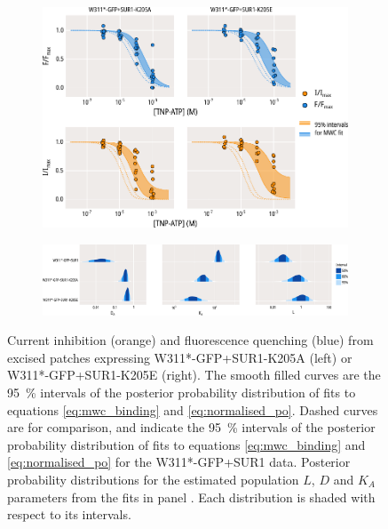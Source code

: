 \begin{figure}[h]
	\centering
	\begin{subfigure}[t]{0.9\textwidth}
		\caption{}\label{ch6fig:mwc_k205_1}
		\centering
		\includegraphics[width=\textwidth]{mwc_k205_1.pdf}
	\end{subfigure}
	\vfill
	\begin{subfigure}[t]{0.9\textwidth}
		\caption{}\label{ch6fig:mwc_k205_2}
		\centering
		\includegraphics[width=\textwidth]{mwc_k205_2.pdf}
	\end{subfigure}
	\caption[K205 mutations affect gating and nucleotide binding]{
	 Current inhibition (orange) and fluorescence quenching (blue) from excised patches expressing W311*-GFP+SUR1-K205A (left) or W311*-GFP+SUR1-K205E (right).
	The smooth filled curves are the \SI{95}{\percent} intervals of the posterior probability distribution of fits to equations \ref{eq:mwc_binding} and \ref{eq:normalised_po}.
	Dashed curves are for comparison, and indicate the \SI{95}{\percent} intervals of the posterior probability distribution of fits to equations \ref{eq:mwc_binding} and \ref{eq:normalised_po} for the W311*-GFP+SUR1 data.
	 Posterior probability distributions for the estimated population $L$, $D$ and $K_A$ parameters from the fits in panel .
	Each distribution is shaded with respect to its intervals.
	}\label{ch6fig:k205_fig2}
\end{figure}

